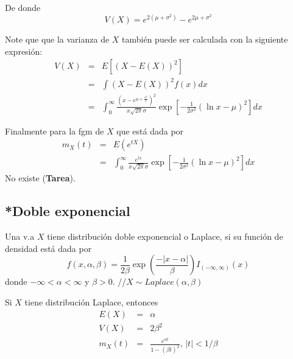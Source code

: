 \begin{i}
De donde 
\begin{equation*}
V(X)=e^{2\left( \mu +\sigma ^{2}\right) }-e^{2\mu +\sigma ^{2}}
\end{equation*}


Note que que la varianza de $X$ también puede ser calculada con la
siguiente expresión:
\begin{eqnarray*}
V(X) &=&E\left[ \left( X-E(X)\right) ^{2}\right] \\
&=&\int \left( X-E(X)\right) ^{2}f(x)dx \\
&=&\int_{0}^{\infty }\frac{\left( x-e^{\mu +\frac{\sigma ^{2}}{2}}\right)
^{2}}{x\sqrt{2\pi }\sigma }\exp \left[ -\frac{1}{2\sigma ^{2}}\left( \ln
x-\mu \right) ^{2}\right] dx
\end{eqnarray*}


Finalmente para la fgm de $X$ que está dada por 
\begin{eqnarray*}
m_{X}(t) &=&E(e^{tX}) \\
&=&\int_{0}^{\infty }\frac{e^{tx}}{x\sqrt{2\pi }\sigma }\exp \left[ -\frac{1
}{2\sigma ^{2}}\left( \ln x-\mu \right) ^{2}\right] dx
\end{eqnarray*}%
No existe (\textbf{Tarea}).

\subsection{*Doble exponencial}

\begin{definition}
Una v.a $X$ tiene distribución doble exponencial o Laplace, si su función de densidad está dada por 
\begin{equation*}
f(x,\alpha ,\beta )=\frac{1}{2\beta }\exp \left( \frac{-\left\vert x-\alpha
\right\vert }{\beta }\right) I_{(-\infty ,\infty )}(x)
\end{equation*}%
donde $-\infty <\alpha <\infty $ y $\beta >0.$ //$X\sim Laplace(\alpha
,\beta )$
\end{definition}

\begin{theorem}
Si $X$ tiene distribución Laplace, entonces
\begin{eqnarray*}
E(X) &=&\alpha \\
V(X) &=&2\beta ^{2} \\
m_{X}(t) &=&\frac{e^{\alpha t}}{1-(\beta t)^{2}}\text{, \ \ \ }\left\vert
t\right\vert <1/\beta
\end{eqnarray*}
\end{theorem}


\end{i}
